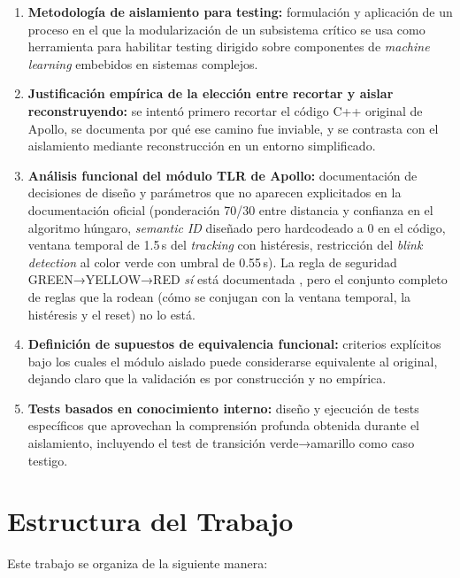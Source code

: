 \begin{enumerate}
    \item \textbf{Metodología de aislamiento para testing:} formulación y aplicación de un proceso en el que la modularización de un subsistema crítico se usa como herramienta para habilitar testing dirigido sobre componentes de \textit{machine learning} embebidos en sistemas complejos.

    \item \textbf{Justificación empírica de la elección entre recortar y aislar reconstruyendo:} se intentó primero recortar el código C++ original de Apollo, se documenta por qué ese camino fue inviable, y se contrasta con el aislamiento mediante reconstrucción en un entorno simplificado.

    \item \textbf{Análisis funcional del módulo TLR de Apollo:} documentación de decisiones de diseño y parámetros que no aparecen explicitados en la documentación oficial (ponderación 70/30 entre distancia y confianza en el algoritmo húngaro, \textit{semantic ID} diseñado pero hardcodeado a 0 en el código, ventana temporal de 1.5\,s del \textit{tracking} con histéresis, restricción del \textit{blink detection} al color verde con umbral de 0.55\,s). La regla de seguridad GREEN→YELLOW→RED \textit{sí} está documentada \cite{apollo_tlr_docs}, pero el conjunto completo de reglas que la rodean (cómo se conjugan con la ventana temporal, la histéresis y el reset) no lo está.

    \item \textbf{Definición de supuestos de equivalencia funcional:} criterios explícitos bajo los cuales el módulo aislado puede considerarse equivalente al original, dejando claro que la validación es por construcción y no empírica.

    \item \textbf{Tests basados en conocimiento interno:} diseño y ejecución de tests específicos que aprovechan la comprensión profunda obtenida durante el aislamiento, incluyendo el test de transición verde→amarillo como caso testigo.
\end{enumerate}

\section{Estructura del Trabajo}

Este trabajo se organiza de la siguiente manera:

